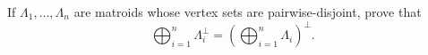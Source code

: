 If $\Lambda_1, \ldots, \Lambda_n$ are matroids whose vertex sets are pairwise-disjoint, prove that
$$\bigoplus_{i=1}^{n} \Lambda_i^\perp = \left( \bigoplus_{i=1}^{n} \Lambda_i \right)^\perp.$$

